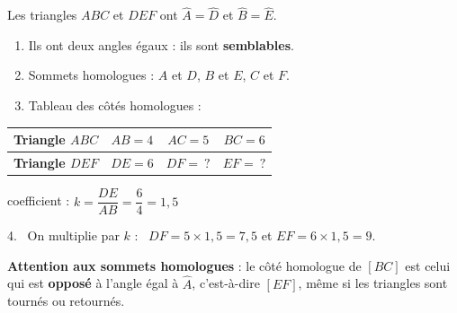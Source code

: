 \documentclass[11pt]{article}
\newcommand{\f}[2]{\dfrac{#1}{#2}}
\begin{document}
\begin{minipage}{0.56\linewidth}
\begin{exemple}[Méthode]
Les triangles $ABC$ et $DEF$ ont $\widehat{A} = \widehat{D}$ et $\widehat{B} = \widehat{E}$.
\begin{enumerate}
\item Ils ont deux angles égaux : ils sont \textbf{semblables}.
\item Sommets homologues : $A$ et $D$, $B$ et $E$, $C$ et $F$.
\item Tableau des côtés homologues :
\end{enumerate}
\end{exemple}
\end{minipage}\hfill
\begin{minipage}{0.42\linewidth}\centering
{}
\end{minipage}

\begin{center}
\renewcommand{\arraystretch}{1.4}
\begin{tabular}{|l|c|c|c|}
\hline
\textbf{Triangle $ABC$} & $AB = 4$ & $AC = 5$ & $BC = 6$ \\ \hline
\textbf{Triangle $DEF$} & $DE = 6$ & $DF = \ ?$ & $EF = \ ?$ \\ \hline
\end{tabular}
\qquad coefficient : $k = \f{DE}{AB} = \f{6}{4} = 1,5$
\end{center}
4. \ On multiplie par $k$ : \ $DF = 5 \times 1,5 = 7,5$ \qquad et \qquad $EF = 6 \times 1,5 = 9$.
\medskip

\begin{remarque}
\textbf{Attention aux sommets homologues} : le côté homologue de $[BC]$ est celui qui est \textbf{opposé} à l'angle
égal à $\widehat{A}$, c'est-à-dire $[EF]$, même si les triangles sont tournés ou retournés.
\end{remarque}
\end{document}

